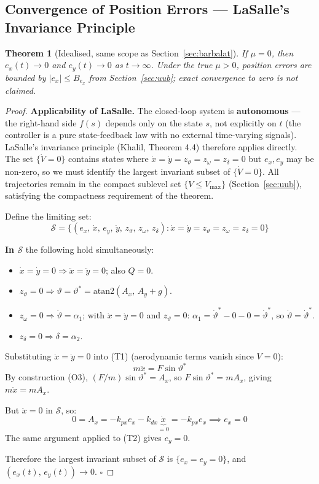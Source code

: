 \documentclass[11pt,a4paper]{article}
\theoremstyle{plain}
\newtheorem{theorem}{Theorem}[section]
\theoremstyle{remark}
\newcommand{\vth}{\vartheta}
\newcommand{\vths}{\vartheta^*}
\newcommand{\zth}{z_{\vth}}
\newcommand{\zom}{z_{\omega}}
\newcommand{\zdel}{z_{\delta}}
\begin{document}
\subsection{Convergence of Position Errors --- LaSalle's Invariance Principle}
\label{sec:lasalle}

\begin{theorem}[Idealised, same scope as Section~\ref{sec:barbalat}]
If $\mu = 0$, then $e_x(t) \to 0$ and $e_y(t) \to 0$ as $t \to \infty$. Under the true $\mu > 0$, position errors are bounded by $|e_x| \leq B_{e_x}$ from Section~\ref{sec:uub}; exact convergence to zero is not claimed.
\end{theorem}

\begin{proof}
\textbf{Applicability of LaSalle.} The closed-loop system is \textbf{autonomous} --- the right-hand side $f(s)$ depends only on the state $s$, not explicitly on $t$ (the controller is a pure state-feedback law with no external time-varying signals). LaSalle's invariance principle (Khalil, Theorem 4.4) therefore applies directly. The set $\{\dot V = 0\}$ contains states where $\dot x = \dot y = \zth = \zom = \zdel = 0$ but $e_x, e_y$ may be non-zero, so we must identify the largest invariant subset of $\{\dot V = 0\}$. All trajectories remain in the compact sublevel set $\{V \leq V_{\max}\}$ (Section~\ref{sec:uub}), satisfying the compactness requirement of the theorem.

Define the limiting set:
\[
  \mathcal{S} = \bigl\{(e_x,\, \dot x,\, e_y,\, \dot y,\, \zth,\, \zom,\, \zdel) : \dot x = \dot y = \zth = \zom = \zdel = 0\bigr\}
\]

\textbf{In $\mathcal{S}$} the following hold simultaneously:
\begin{itemize}
  \item $\dot x = \dot y = 0 \Rightarrow \ddot x = \ddot y = 0$; also $Q = 0$.
  \item $\zth = 0 \Rightarrow \vth = \vths = \mathrm{atan2}(A_x,\, A_y+g)$.
  \item $\zom = 0 \Rightarrow \dot\vth = \alpha_1$; with $\dot x = \dot y = 0$ and $\zth = 0$: $\alpha_1 = \dot\vths - 0 - 0 = \dot\vths$, so $\dot\vth = \dot\vths$.
  \item $\zdel = 0 \Rightarrow \delta = \alpha_2$.
\end{itemize}

Substituting $\dot x = \dot y = 0$ into (T1) (aerodynamic terms vanish since $V = 0$):
\[
  m\ddot x = F\sin\vths
\]
By construction (O3), $(F/m)\sin\vths = A_x$, so $F\sin\vths = mA_x$, giving $m\ddot x = mA_x$.

But $\ddot x = 0$ in $\mathcal{S}$, so:
\[
  0 = A_x = -k_{px}e_x - k_{dx}\underbrace{\dot x}_{=0} = -k_{px}e_x \implies e_x = 0
\]
The same argument applied to (T2) gives $e_y = 0$.

Therefore the largest invariant subset of $\mathcal{S}$ is $\{e_x = e_y = 0\}$, and $(e_x(t),\, e_y(t)) \to 0$. $\square$
\end{proof}
\end{document}
